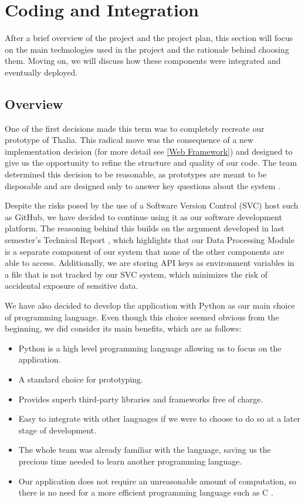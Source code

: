 \documentclass[main.tex]{subfiles}
\begin{document}
\section{Coding and Integration}

After a brief overview of the project and the project plan, this section will focus on the main technologies used in the project and the rationale behind choosing them. Moving on, we will discuss how these components were integrated and eventually deployed.

\subsection{Overview}

One of the first decisions made this term was to completely recreate our prototype of Thalia. This radical move was the consequence of a new implementation decision (for more detail see \ref{Web Framework}) and designed to give us the opportunity to refine the structure and quality of our code. The team determined this decision to be reasonable, as prototypes are meant to be disposable and are designed only to answer key questions about the system \cite{pragmaticprog}.

Despite the risks posed by the use of a Software Version Control (SVC) host such as GitHub, we have decided to continue using it as our software development platform. The reasoning behind this builds on the argument developed in last semester's Technical Report \cite{TR}, which highlights that our Data Processing Module is a separate component of our system that none of the other components are able to access. Additionally, we are storing API keys as environment variables in a file that is not tracked by our SVC system, which minimizes the risk of accidental exposure of sensitive data.

We have also decided to develop the application with Python as our main choice of programming language. Even though this choice seemed obvious from the beginning, we did consider its main benefits, which are as follows:

\begin{itemize}
    \item Python is a high level programming language allowing us to focus on the application.
    \item A standard choice for prototyping.
    \item Provides superb third-party libraries and frameworks free of charge.
    \item Easy to integrate with other languages if we were to choose to do so at a later stage of development.
    \item The whole team was already familiar with the language, saving us the precious time needed to learn another programming language.
    \item Our application does not require an unreasonable amount of computation, so there is no need for a more efficient programming language such as C \cite{languagescomparison}.
\end{itemize}
\end{document}

